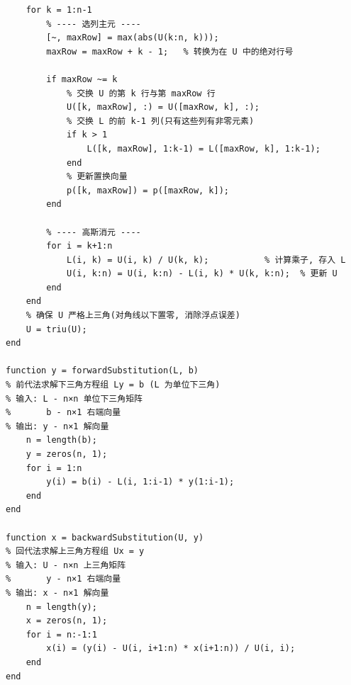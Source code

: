\documentclass[12pt,a4paper]{ctexart}
\begin{document}
\begin{lstlisting}
    for k = 1:n-1
        % ---- 选列主元 ----
        [~, maxRow] = max(abs(U(k:n, k)));
        maxRow = maxRow + k - 1;   % 转换为在 U 中的绝对行号
        
        if maxRow ~= k
            % 交换 U 的第 k 行与第 maxRow 行
            U([k, maxRow], :) = U([maxRow, k], :);
            % 交换 L 的前 k-1 列(只有这些列有非零元素)
            if k > 1
                L([k, maxRow], 1:k-1) = L([maxRow, k], 1:k-1);
            end
            % 更新置换向量
            p([k, maxRow]) = p([maxRow, k]);
        end
        
        % ---- 高斯消元 ----
        for i = k+1:n
            L(i, k) = U(i, k) / U(k, k);           % 计算乘子, 存入 L
            U(i, k:n) = U(i, k:n) - L(i, k) * U(k, k:n);  % 更新 U
        end
    end
    % 确保 U 严格上三角(对角线以下置零, 消除浮点误差)
    U = triu(U);
end

function y = forwardSubstitution(L, b)
% 前代法求解下三角方程组 Ly = b (L 为单位下三角)
% 输入: L - n×n 单位下三角矩阵
%       b - n×1 右端向量
% 输出: y - n×1 解向量
    n = length(b);
    y = zeros(n, 1);
    for i = 1:n
        y(i) = b(i) - L(i, 1:i-1) * y(1:i-1);
    end
end

function x = backwardSubstitution(U, y)
% 回代法求解上三角方程组 Ux = y
% 输入: U - n×n 上三角矩阵
%       y - n×1 右端向量
% 输出: x - n×1 解向量
    n = length(y);
    x = zeros(n, 1);
    for i = n:-1:1
        x(i) = (y(i) - U(i, i+1:n) * x(i+1:n)) / U(i, i);
    end
end
\end{lstlisting}
\end{document}

